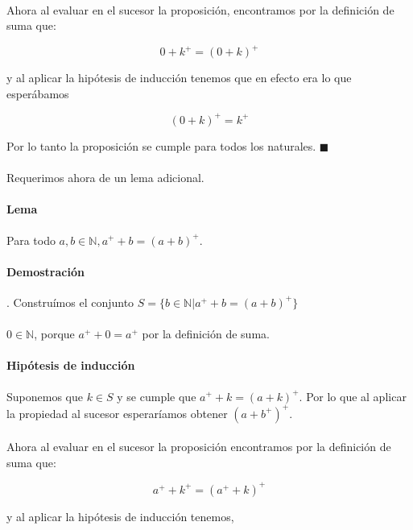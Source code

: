 \documentclass{article}
\begin{document}
\paragraph{}Ahora al evaluar en el sucesor la proposición, encontramos por la definición de suma que:

$$ 0 + k^+ = (0 + k)^+$$

y al aplicar la hipótesis de inducción tenemos que en efecto era lo que esperábamos

$$(0 + k)^+ = k^+$$

Por lo tanto la proposición se cumple para todos los naturales. $\blacksquare$

\paragraph{} Requerimos ahora de un lema adicional.

\paragraph{Lema} Para todo $a,b \in \mathbb{N}, a^+ + b = (a + b)^+$.

\paragraph{Demostración}. Construímos el conjunto $S =  \{ b \in \mathbb{N}| a^+ + b = (a + b)^+ \}$

\paragraph{} $0 \in \mathbb{N}$, porque $a^+ + 0 = a^+$ por la definición de suma.

\paragraph{Hipótesis de inducción} Suponemos que $k \in S$ y se cumple que $a^+ + k = (a + k)^+$. Por lo que al aplicar la propiedad al sucesor esperaríamos obtener $(a + b^+)^+$.

\paragraph{}Ahora al evaluar en el sucesor la proposición encontramos por la definición de suma que:

$$ a^+ + k^+ = (a^+ + k)^+$$

y al aplicar la hipótesis de inducción tenemos,
\end{document}
